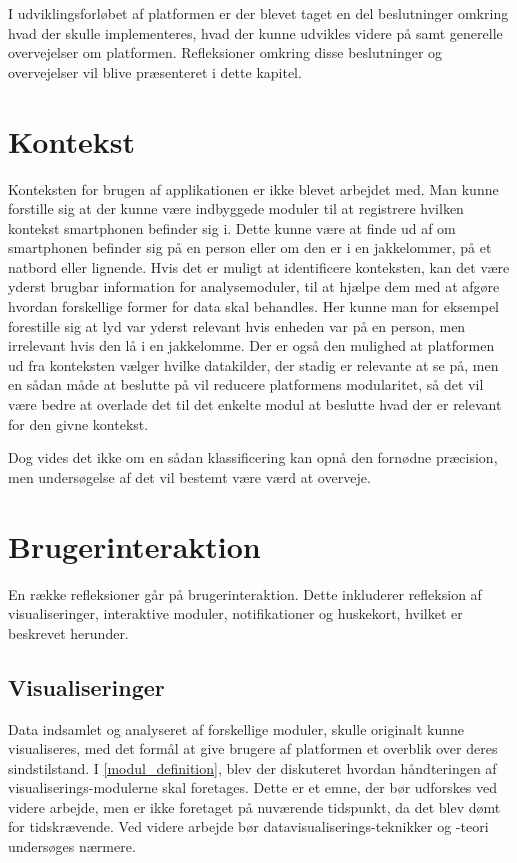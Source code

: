 I udviklingsforløbet af platformen er der blevet taget en del beslutninger omkring hvad der skulle implementeres, hvad der kunne udvikles videre på samt generelle overvejelser om platformen.
Refleksioner omkring disse beslutninger og overvejelser vil blive præsenteret i dette kapitel.

\section{Kontekst}
Konteksten for brugen af applikationen er ikke blevet arbejdet med.
Man kunne forstille sig at der kunne være indbyggede moduler til at registrere hvilken kontekst smartphonen befinder sig i.
Dette kunne være at finde ud af om smartphonen befinder sig på en person eller om den er i en jakkelommer, på et natbord eller lignende.
Hvis det er muligt at identificere konteksten, kan det være yderst brugbar information for analysemoduler, til at hjælpe dem med at afgøre hvordan forskellige former for data skal behandles.
Her kunne man for eksempel forestille sig at lyd var yderst relevant hvis enheden var på en person, men irrelevant hvis den lå i en jakkelomme.
Der er også den mulighed at platformen ud fra konteksten vælger hvilke datakilder, der stadig er relevante at se på, men en sådan måde at beslutte på vil reducere platformens modularitet, så det vil være bedre at overlade det til det enkelte modul at beslutte hvad der er relevant for den givne kontekst.

Dog vides det ikke om en sådan klassificering kan opnå den fornødne præcision, men undersøgelse af det vil bestemt være værd at overveje.

\section{Brugerinteraktion}
En række refleksioner går på brugerinteraktion.
Dette inkluderer refleksion af visualiseringer, interaktive moduler, notifikationer og huskekort, hvilket er beskrevet herunder.

\subsection{Visualiseringer}
Data indsamlet og analyseret af forskellige moduler, skulle originalt kunne visualiseres, med det formål at give brugere af platformen et overblik over deres sindstilstand.
I \cref{modul_definition}, blev der diskuteret hvordan håndteringen af visualiserings-modulerne skal foretages.
Dette er et emne, der bør udforskes ved videre arbejde, men er ikke foretaget på nuværende tidspunkt, da det blev dømt for tidskrævende.
Ved videre arbejde bør datavisualiserings-teknikker og -teori undersøges nærmere.

